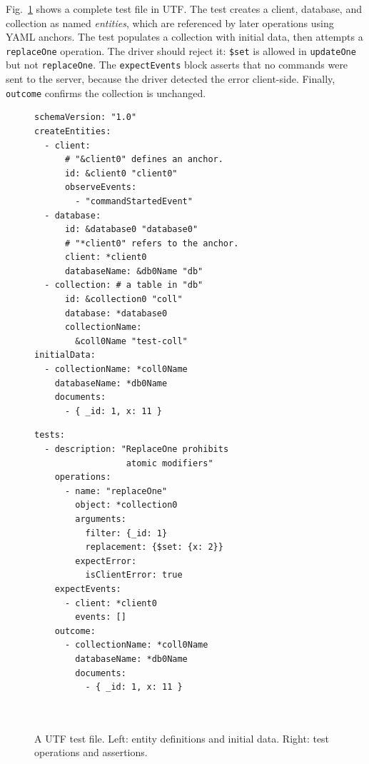 \documentclass[conference]{IEEEtran}
\begin{document}
Fig.~\ref{fig:utf-example} shows a complete test file in UTF. The test creates a client, database, and collection as named \textit{entities}, which are referenced by later operations using YAML anchors. The test populates a collection with initial data, then attempts a \texttt{replaceOne} operation. The driver should reject it: \texttt{\$set} is allowed in \texttt{updateOne} but not \texttt{replaceOne}. The \texttt{expectEvents} block asserts that no commands were sent to the server, because the driver detected the error client-side. Finally, \texttt{outcome} confirms the collection is unchanged.

\begin{figure}[t]
\begin{minipage}[t]{0.48\textwidth}
\begin{Verbatim}[fontsize=\small, frame=single]
schemaVersion: "1.0"
createEntities:
  - client:
      # "&client0" defines an anchor.
      id: &client0 "client0"
      observeEvents:
        - "commandStartedEvent"
  - database:
      id: &database0 "database0"
      # "*client0" refers to the anchor.
      client: *client0
      databaseName: &db0Name "db"
  - collection: # a table in "db"
      id: &collection0 "coll"
      database: *database0
      collectionName:
        &coll0Name "test-coll"
initialData:
  - collectionName: *coll0Name
    databaseName: *db0Name
    documents:
      - { _id: 1, x: 11 }
\end{Verbatim}
\end{minipage}
\hfill
\begin{minipage}[t]{0.48\textwidth}
\begin{Verbatim}[fontsize=\small, frame=single]
tests:
  - description: "ReplaceOne prohibits
                  atomic modifiers"
    operations:
      - name: "replaceOne"
        object: *collection0
        arguments:
          filter: {_id: 1}
          replacement: {$set: {x: 2}}
        expectError:
          isClientError: true
    expectEvents:
      - client: *client0
        events: []
    outcome:
      - collectionName: *coll0Name
        databaseName: *db0Name
        documents:
          - { _id: 1, x: 11 }



\end{Verbatim}
\end{minipage}
\caption{A UTF test file. Left: entity definitions and initial data. Right: test operations and assertions.}
\label{fig:utf-example}
\end{figure}
\end{document}
